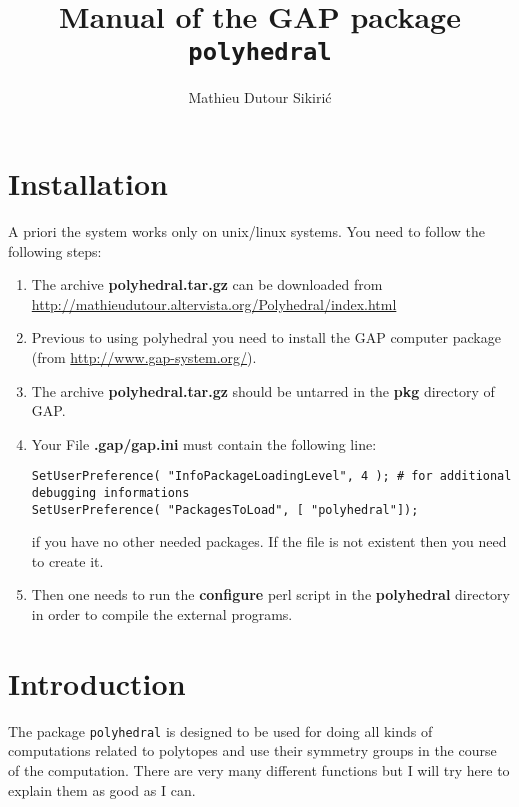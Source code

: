 \documentclass[12pt]{amsart}
\begin{document}
\author{Mathieu Dutour Sikiri\'c}
\address{Mathieu Dutour Sikiri\'c, Rudjer Boskovi\'c Institute, Bijenicka 54, 10000 Zagreb, Croatia}


\title{Manual of the GAP package {\tt polyhedral}}
\date{}

\maketitle
\tableofcontents

\section{Installation}

A priori the system works only on unix/linux systems.
You need to follow the following steps:
\begin{enumerate}
\item The archive {\bf polyhedral.tar.gz} can be downloaded from
\url{http://mathieudutour.altervista.org/Polyhedral/index.html}

\item Previous to using polyhedral you need to install the GAP computer package (from \url{http://www.gap-system.org/}).

\item The archive {\bf polyhedral.tar.gz} should be untarred in the {\bf pkg} directory of GAP.

\item Your File {\bf .gap/gap.ini} must contain the following line:
\begin{verbatim}
SetUserPreference( "InfoPackageLoadingLevel", 4 ); # for additional debugging informations
SetUserPreference( "PackagesToLoad", [ "polyhedral"]);
\end{verbatim}
if you have no other needed packages. If the file is not existent then you need to create it.

\item Then one needs to run the {\bf configure} perl script in the {\bf polyhedral} directory in order to compile the external programs.
\end{enumerate}


\section{Introduction}
The package {\tt polyhedral} is designed to be used for doing all kinds
of computations related to polytopes and use their symmetry groups in
the course of the computation.
There are very many different functions but I will try here to explain
them as good as I can.
\end{document}
